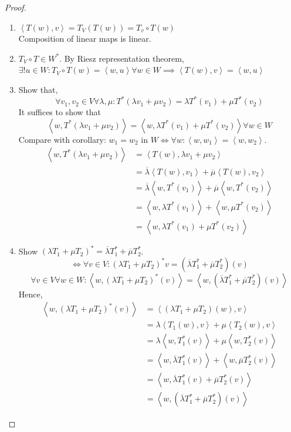 \documentclass[a4paper]{article}
\numberwithin{lecref}{section}
\newcommand{\ip}[2]{\left\langle#1,#2\right\rangle} %
\begin{document}
\begin{proof}
  \begin{enumerate}
    \item $\ip{T(w)}{v} = T_V(T(w)) = T_v \circ T(w)$ \\
      Composition of linear maps is linear.
    \item $T_V \circ T \in W^*$. By Riesz representation theorem, $\exists! u \in W: T_V \circ T(w) = \ip{w}{u} \forall w \in W \implies \ip{T(w)}{v} = \ip wu$
    \item Show that,
      \[ \forall v_1, v_2 \in V \forall \lambda, \mu: T^*(\lambda v_1 + \mu v_2) = \lambda T^*(v_1) + \mu T^*(v_2) \]
      It suffices to show that
      \[ \ip{w}{T^*(\lambda v_1 + \mu v_2)} = \ip{w}{\lambda T^*(v_1) + \mu T^*(v_2)} \forall w \in W \]
      Compare with corollary: $w_1 = w_2$ in $W \iff \forall w: \ip{w}{w_1} = \ip{w}{w_2}$.
      \begin{align*}
        \ip{w}{T^*(\lambda v_1 + \mu v_2)} &= \ip{T(w)}{\lambda v_1 + \mu v_2} \\
          &= \overline{\lambda} \ip{T(w)}{v_1} + \overline{\mu} \ip{T(w)}{v_2} \\
          &= \overline{\lambda} \ip{w}{T^*(v_1)} + \overline{\mu} \ip{w}{T^*(v_2)} \\
          &= \ip{w}{\lambda T^*(v_1)} + \ip{w}{\mu T^*(v_2)} \\
          &= \ip{w}{\lambda T^*(v_1) + \mu T^*(v_2)}
      \end{align*}
    \item Show $(\lambda T_1 + \mu T_2)^* = \overline{\lambda} T_1^* + \overline{\mu} T_2^*$. \\
      \[ \iff \forall v \in V: (\lambda T_1 + \mu T_2)^* v = (\overline{\lambda} T_1^* + \overline{\mu} T_2^*)(v) \]
      \[ \forall v \in V \forall w \in W: \ip{w}{(\lambda T_1 + \mu T_2)^*(v)} = \ip{w}{(\overline{\lambda} T_1^* + \overline{\mu} T_2^*)(v)} \]
      Hence,
      \begin{align*}
        \ip{w}{(\lambda T_1 + \mu T_2)^*(v)}
          &= \ip{(\lambda T_1 + \mu T_2)(w)}{v} \\
          &= \lambda \ip{T_1(w)}{v} + \mu\ip{T_2(w)}{v} \\
          &= \lambda \ip{w}{T_1^*(v)} + \mu \ip{w}{T_2^*(v)} \\
          &= \ip{w}{\overline{\lambda} T_1^*(v)} + \ip{w}{\overline{\mu} T_2^*(v)} \\
          &= \ip{w}{\overline{\lambda} T_1^*(v) + \overline{\mu} T_2^*(v)} \\
          &= \ip{w}{(\overline\lambda T_1^* + \overline\mu T_2^*)(v)}
      \end{align*}


\end{enumerate}
\end{proof}
\end{document}
